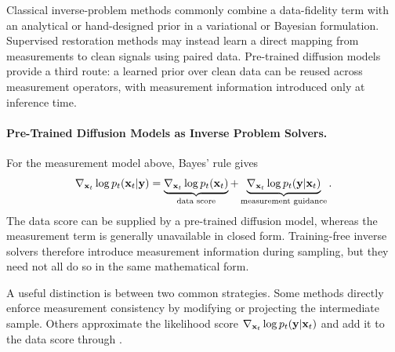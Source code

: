 Classical inverse-problem methods commonly combine a data-fidelity term with an
analytical or hand-designed prior in a variational or Bayesian formulation.
Supervised restoration methods may instead learn a direct mapping from
measurements to clean signals using paired data. Pre-trained diffusion models
provide a third route: a learned prior over clean data can be reused across
measurement operators, with measurement information introduced only at
inference time.

\paragraph{Pre-Trained Diffusion Models as Inverse Problem Solvers.}
For the measurement model above, Bayes' rule gives
\begin{align}
\nabla_{{\mathbf{x}}_t}\log p_t({\mathbf{x}}_t|{\mathbf{y}})
=
\underbrace{\nabla_{{\mathbf{x}}_t}\log p_t({\mathbf{x}}_t)}_{\text{data score}}
+
\underbrace{\nabla_{{\mathbf{x}}_t}\log p_t({\mathbf{y}}|{\mathbf{x}}_t)}_{\text{measurement guidance}}.
\label{eq:bayes_rule}
\end{align}
The data score can be supplied by a pre-trained diffusion model, whereas the
measurement term is generally unavailable in closed form. Training-free
inverse solvers therefore introduce measurement information during sampling,
but they need not all do so in the same mathematical form.

A useful distinction is between two common strategies. Some methods directly
enforce measurement consistency by modifying or projecting the intermediate
sample. Others approximate the likelihood score
$\nabla_{{\mathbf{x}}_t}\log p_t({\mathbf{y}}|{\mathbf{x}}_t)$ and add it to the data score through
.


